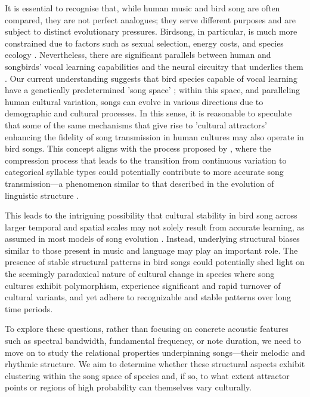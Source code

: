 It is essential to recognise that, while human music and bird song are often compared, they are not perfect analogues; they serve different purposes and are subject to distinct evolutionary pressures. Birdsong, in particular, is much more constrained due to factors such as sexual selection, energy costs, and species ecology \autocite{verzijden2012, demery2021, nowicki1998, spencer2003, sierro2023}. Nevertheless, there are significant parallels between human and songbirds' vocal learning capabilities and the neural circuitry that underlies them \autocite{jarvis2019, rouse2021}. Our current understanding suggests that bird species capable of vocal learning have a genetically predetermined 'song space' \autocite{james2017, lachlan2010}; within this space, and paralleling human cultural variation, songs can evolve in various directions due to demographic and cultural processes. In this sense, it is reasonable to speculate that some of the same mechanisms that give rise to 'cultural attractors' enhancing the fidelity of song transmission in human cultures may also operate in bird songs. This concept aligns with the process proposed by \autocite{tchernichovski2017}, where the compression process that leads to the transition from continuous variation to categorical syllable types could potentially contribute to more accurate song transmission---a phenomenon similar to that described in the evolution of linguistic structure \autocite{gibson2019, decastro-arrazola2019, kirby2017, tamariz2016, silvey2019}.

This leads to the intriguing possibility that cultural stability in bird song across larger temporal and spatial scales may not solely result from accurate learning, as assumed in most models of song evolution \autocite{lachlan2018, hudson2022, pichkar2023, youngblood2022}. Instead, underlying structural biases similar to those present in music and language may play an important role. The presence of stable structural patterns in bird songs could potentially shed light on the seemingly paradoxical nature of cultural change in species where song cultures exhibit polymorphism, experience significant and rapid turnover of cultural variants, and yet adhere to recognizable and stable patterns over long time periods. 

To explore these questions, rather than focusing on concrete acoustic features such as spectral bandwidth, fundamental frequency, or note duration, we need to move on to study the relational properties underpinning songs---their melodic and rhythmic structure. We aim to determine whether these structural aspects exhibit clustering within the song space of species and, if so, to what extent attractor points or regions of high probability can themselves vary culturally. 

